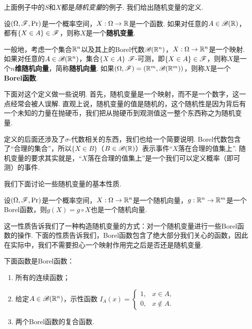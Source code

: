 上面例子中的$S$和$X$都是\textit{随机变量}的例子. 我们给出随机变量的定义. 

\begin{definition}
设$(\Omega,\mathscr{F},\Pr)$是一个概率空间，$X:\Omega\to\mathbb{R}$是一个函数. 如果对任意的$A\in\mathscr{B}(\mathbb{R})$，都有$\{X\in A\}\in\mathscr{F}$，则称$X$是一个\textbf{随机变量}. 

一般地，考虑一个集合$\mathbb{R}^n$以及其上的Borel代数$\mathscr{B}(\mathbb{R}^n)$，$X:\Omega\to \mathbb{R}^n$是一个映射. 如果对任意的$A\in\mathscr{B}(\mathbb{R}^n)$，集合$\{X\in A\}$ $\mathscr{F}$-可测，即$\{X\in A\}\in\mathscr{F}$，则称$X$是一个\textbf{$n$维随机向量}，简称\textbf{随机向量}. 如果$(\Omega,\mathscr{F})=(\mathbb{R}^m,\mathscr{B}(\mathbb{R}^m))$，则称$X$是一个\textbf{Borel函数}.
\end{definition}

下面对这个定义做一些说明. 首先，随机变量是一个映射，而不是一个数字，这一点经常会被人误解. 直观上说，随机变量的值是随机的，这个随机性是因为背后有一个未知的力量在抛硬币，我们把从抛硬币到观测值这一整个东西称之为随机变量. 

定义的后面还涉及了$\sigma$-代数相关的东西，我们也给一个简要说明. Borel代数包含了“合理的集合”，所以$\{X\in B\}$（$B\in\mathscr{B}(\mathbb{R})$）表示事件“$X$落在合理的值集上”. 随机变量的要求其实就是，“$X$落在合理的值集上”是一个我们可以定义概率（即可测）的事件. 

我们下面讨论一些随机变量的基本性质. 

\begin{theorem}\label{theorem:random-variable}
设$(\Omega,\mathscr{F},\Pr)$是一个概率空间，$X:\Omega\to\mathbb{R}^n$是一个随机向量，$g:\mathbb{R}^n\to\mathbb{R}^m$是一个Borel函数，则$g(X)=g\circ X$也是一个随机向量. 
\end{theorem}

这一性质告诉我们了一种构造随机变量的方式：对一个随机变量进行一些Borel函数的操作. 下面的性质告诉我们，Borel函数包含了绝大部分我们关心的函数，因此在实际中，我们不需要担心一个映射作用完之后是否还是随机变量.

\begin{proposition}\label{proposition:borel-function}
下面函数是Borel函数：
\begin{enumerate}
    \item 所有的连续函数；
    \item 给定$A\in\mathscr{B}(\mathbb{R}^n)$，示性函数
    $I_A(x) = \begin{cases}
        1, & x\in A,\\
        0, & x\notin A.
    \end{cases}$
    \item 两个Borel函数的复合函数. 
\end{enumerate}
\end{proposition}



